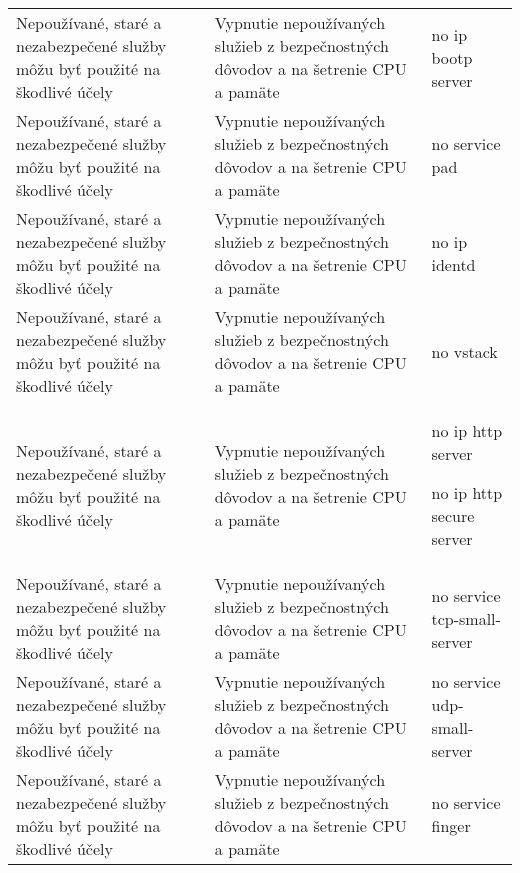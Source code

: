 \begin{longtable}[!htbp]{|L{10em}L{10em}>{\selectfont}L{34em}|}
	
	
	 Nepoužívané, staré a nezabezpečené služby môžu byť použité na škodlivé účely	&Vypnutie nepoužívaných služieb z bezpečnostných dôvodov a na šetrenie CPU a pamäte 	&no ip bootp server\\
	
	
	
	
	Nepoužívané, staré a nezabezpečené služby môžu byť použité na škodlivé účely	&Vypnutie nepoužívaných služieb z bezpečnostných dôvodov a na šetrenie CPU a pamäte 	&no service pad\\
	
	
	
	
	 Nepoužívané, staré a nezabezpečené služby môžu byť použité na škodlivé účely	&Vypnutie nepoužívaných služieb z bezpečnostných dôvodov a na šetrenie CPU a pamäte 	&no ip identd\\
	
	
	
	Nepoužívané, staré a nezabezpečené služby môžu byť použité na škodlivé účely	&Vypnutie nepoužívaných služieb z bezpečnostných dôvodov a na šetrenie CPU a pamäte 	&no vstack\\
	
	
	
	 Nepoužívané, staré a nezabezpečené služby môžu byť použité na škodlivé účely	&Vypnutie nepoužívaných služieb z bezpečnostných dôvodov a na šetrenie CPU a pamäte 	&no ip http server
	
	no ip http secure server\\
	
	
	
	Nepoužívané, staré a nezabezpečené služby môžu byť použité na škodlivé účely	&Vypnutie nepoužívaných služieb z bezpečnostných dôvodov a na šetrenie CPU a pamäte 	&no service tcp-small-server\\
	
	
	
	
	 Nepoužívané, staré a nezabezpečené služby môžu byť použité na škodlivé účely	&Vypnutie nepoužívaných služieb z bezpečnostných dôvodov a na šetrenie CPU a pamäte 	&no service udp-small-server\\
	
	
	
	Nepoužívané, staré a nezabezpečené služby môžu byť použité na škodlivé účely	&Vypnutie nepoužívaných služieb z bezpečnostných dôvodov a na šetrenie CPU a pamäte 	&no service finger\\
	

\end{longtable}

